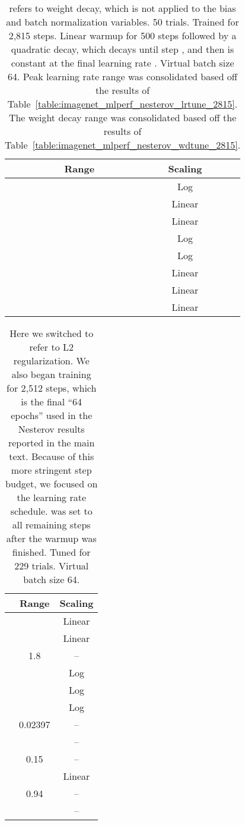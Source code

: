 \documentclass{article}
\begin{document}
\begin{table}[t]
\centering
\setlength{\extrarowheight}{3.5pt}
\begin{tabular}{|c|c|c|}
\hline
 & Range & Scaling \\ \hline
 &  & Log \\ \hline
 &  & Linear \\ \hline
 &  & Linear \\ \hline
 &  & Log \\ \hline
 &  & Log \\ \hline
 &  & Linear \\ \hline
 &  & Linear \\ \hline
 &  & Linear \\ \hline
\end{tabular}
\caption{ refers to weight decay, which is not applied to the bias and batch normalization variables. 50 trials. Trained for 2,815 steps. Linear warmup for 500 steps followed by a quadratic decay, which decays until step , and then is constant at the final learning rate . Virtual batch size 64. Peak learning rate range was consolidated based off the results of Table~\ref{table:imagenet_mlperf_nesterov_lrtune_2815}. The weight decay range was consolidated based off the results of Table~\ref{table:imagenet_mlperf_nesterov_wdtune_2815}.}
\end{table}

\begin{table}[t]
\centering
\setlength{\extrarowheight}{3.5pt}
\begin{tabular}{|c|c|c|}
\hline
 & Range & Scaling \\ \hline
 &  & Linear \\ \hline
 &  & Linear \\ \hline
 & 1.8 & -- \\ \hline
 &  & Log \\ \hline
 &  & Log \\ \hline
 &  & Log \\ \hline
 & 0.02397 & -- \\ \hline
 &  & -- \\ \hline
 & 0.15 & -- \\ \hline
 &  & Linear \\ \hline
 & 0.94 & -- \\ \hline
 &  & -- \\ \hline
\end{tabular}
\caption{Here we switched  to refer to L2 regularization. We also began training for 2,512 steps, which is the final ``64 epochs'' used in the Nesterov results reported in the main text. Because of this more stringent step budget, we focused on the learning rate schedule.  was set to all remaining steps after the warmup was finished. Tuned for 229 trials. Virtual batch size 64.}
\label{table:momentum_vizier4_random}
\end{table}
\end{document}
